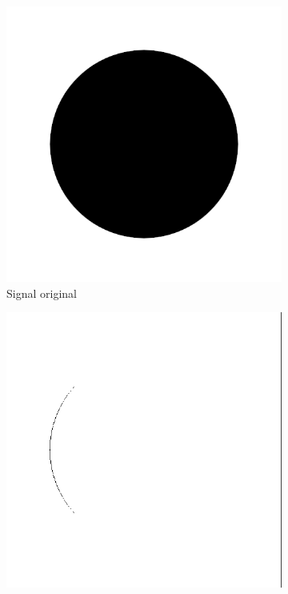 \begin{figure}
    \centering
    \begin{subfigure}[b]{.3\textwidth}
        \includegraphics[width=\textwidth]{contenu/resources/images/disk}
        \caption{Signal original}
    \end{subfigure}
    \hfill
    \begin{subfigure}[b]{.3\textwidth}
        \includegraphics[width=\textwidth]{contenu/resources/images/r2_disk}

\end{subfigure}
\end{figure}
